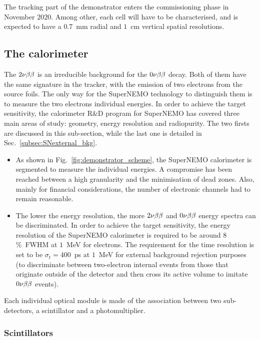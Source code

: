 The tracking part of the demonstrator enters the commissioning phase in November $2020$.
Among other, each cell will have to be characterised, and is expected to have a $0.7$~mm radial and $1$~cm vertical spatial resolutions.


\subsection{The calorimeter}
\label{subsec:SN_calo}

The $2\nu\beta\beta$ is an irreducible background for the $0\nu\beta\beta$ decay.
Both of them have the same signature in the tracker, with the emission of two electrons from the source foils.
The only way for the SuperNEMO technology to distinguish them is to measure the two electrons individual energies.
In order to achieve the target sensitivity, the calorimeter R\&D program for SuperNEMO has covered three main areas of study: geometry, energy resolution and radiopurity.
The two firsts are discussed in this sub-section, while the last one is detailed in Sec.~\ref{subsec:SNexternal_bkg}.
\begin{itemize}
\item As shown in Fig.~\ref{fig:demonstrator_scheme}, the SuperNEMO calorimeter is segmented to measure the individual energies.
A compromise has been reached between a high granularity and the minimisation of dead zones.
Also, mainly for financial considerations, the number of electronic channels had to remain reasonable.
\item The lower the energy resolution, the more $2\nu\beta\beta$ and $0\nu\beta\beta$ energy spectra can be discriminated.
In order to achieve the target sensitivity, the energy resolution of the SuperNEMO calorimeter is required to be around $8$\%~FWHM at $1$~MeV for electrons.
The requirement for the time resolution is set to be ${\sigma_{t}=400}$~ps at $1$~MeV for external background rejection purposes (to discriminate between two-electron internal events from those that originate outside of the detector and then cross its active volume to imitate $0\nu\beta\beta$ events).
\end{itemize}
Each individual optical module is made of the association between two sub-detectors, a scintillator and a photomultiplier.


\subsubsection*{Scintillators}

